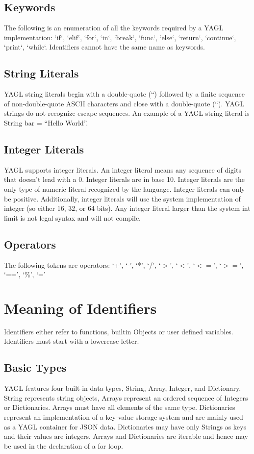 \documentclass[12pt]{article}
\begin{document}
\subsection{Keywords}
The following is an enumeration of all the keywords required by a YAGL implementation:
`if`, `elif`, `for`, `in`, `break`, `func`, `else`, `return`, `continue`, `print`, `while`.  Identifiers cannot have the same name as keywords.

\subsection{String Literals}
YAGL string literals begin with a double-quote (“) followed by a finite sequence of non-double-quote ASCII characters and close with a double-quote (“). YAGL strings do not recognize escape sequences. An example of a YAGL string literal is String bar = “Hello World”.

\subsection{Integer Literals}
YAGL supports integer literals.  An integer literal means any sequence of digits that doesn’t lead with a 0.  Integer literals are in base 10.  Integer literals are the only type of numeric literal recognized by the language.  Integer literals can only be positive.  Additionally, integer literals will use the system implementation of integer (so either 16, 32, or 64 bits).  Any integer literal larger than the system int limit is not legal syntax and will not compile.

\subsection{Operators}
The following tokens are operators:
‘+’, ‘-’, ‘*’, ‘/’, ‘$>$’, ‘$<$’, ‘$<=$’, ‘$>=$’, ‘==’, ‘$\%$’, ‘=’

\section{Meaning of Identifiers}
Identifiers either refer to functions, builtin Objects or user defined variables.  Identifiers must start with a lowercase letter.

\subsection{Basic Types}
YAGL features four built-in data types, String, Array, Integer, and Dictionary. String represents string objects, Arrays represent an ordered sequence of Integers or Dictionaries. Arrays must have all elements of the same type.  Dictionaries represent an implementation of a key-value storage system and are mainly used as a YAGL container for JSON data. Dictionaries may have only Strings as keys and their values are integers. Arrays and Dictionaries are iterable and hence may be used in the declaration of a for loop. 
\end{document}
